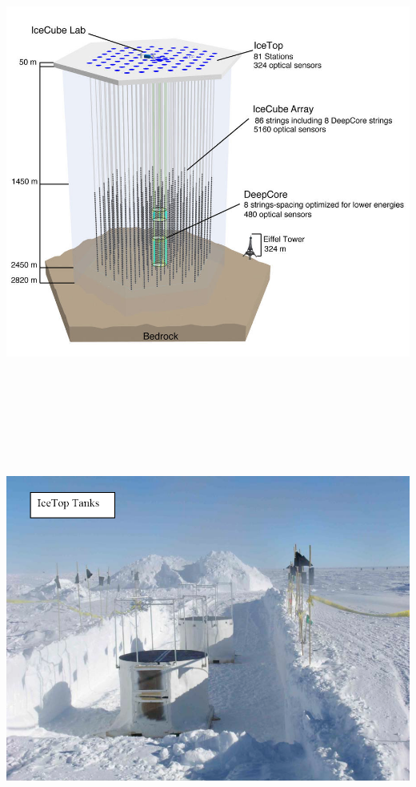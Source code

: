 \Tr
\begin{center}
\includegraphics[keepaspectratio,height=14cm]{ic86-dc}
\end{center}

\Tr
\begin{center}
\includegraphics[keepaspectratio,height=14.5cm]{icetop-snow}
\end{center}

